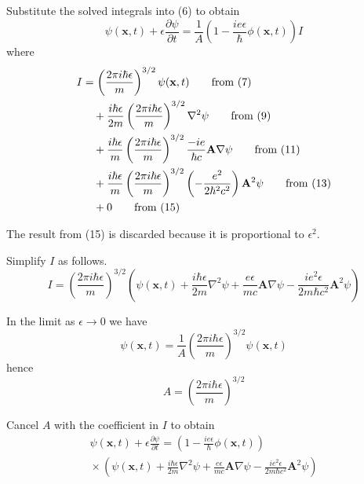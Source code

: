 \documentclass[12pt]{article}
\begin{document}
Substitute the solved integrals into (6) to obtain
\begin{equation*}
\psi(\mathbf x,t)+\epsilon\frac{\partial\psi}{\partial t}
=\frac{1}{A}
\left(1-\frac{ie\epsilon}{\hbar}\phi(\mathbf x,t)\right) I
\end{equation*}
where
\begin{align*}
I&=\left(\frac{2\pi i\hbar\epsilon}{m}\right)^{3/2}\psi(\mathbf x,t)
\tag*{\text{from (7)}}
\\
&\quad{}+\frac{i\hbar\epsilon}{2m}\left(\frac{2\pi i\hbar\epsilon}{m}\right)^{3/2}\nabla^2\psi
\tag*{\text{from (9)}}
\\
&\quad{}+\frac{i\hbar\epsilon}{m}\left(\frac{2\pi i\hbar\epsilon}{m}\right)^{3/2}
\frac{-ie}{\hbar c}\mathbf A\nabla\psi
\tag*{\text{from (11)}}
\\
&\quad{}+\frac{i\hbar\epsilon}{m}
\left(\frac{2\pi i\hbar\epsilon}{m}\right)^{3/2}
\left(-\frac{e^2}{2\hbar^2 c^2}\right)
\mathbf A^2\psi
\tag*{\text{from (13)}}
\\
&\quad{}+0
\tag*{\text{from (15)}}
\end{align*}

The result from (15) is discarded because it is proportional to $\epsilon^2$.

\bigskip
Simplify $I$ as follows.
\begin{equation*}
I=\left(\frac{2\pi i\hbar\epsilon}{m}\right)^{3/2}
\left(
\psi(\mathbf x,t)
+\frac{i\hbar\epsilon}{2m}\nabla^2\psi
+\frac{e\epsilon}{mc}\mathbf A\nabla\psi
-\frac{ie^2\epsilon}{2m\hbar c^2}\mathbf A^2\psi
\right)
\tag{16}
\end{equation*}

\bigskip
In the limit as $\epsilon\rightarrow0$ we have
\begin{equation*}
\psi(\mathbf x,t)=\frac{1}{A}\left(\frac{2\pi i\hbar\epsilon}{m}\right)^{3/2}\psi(\mathbf x,t)
\end{equation*}
hence
\begin{equation*}
A=\left(\frac{2\pi i\hbar\epsilon}{m}\right)^{3/2}
\end{equation*}

Cancel $A$ with the coefficient in $I$ to obtain
\begin{multline*}
\psi(\mathbf x,t)+\epsilon\frac{\partial\psi}{\partial t}
=\left(1-\frac{ie\epsilon}{\hbar}\phi(\mathbf x,t)\right)
\\
{}\times
\left(
\psi(\mathbf x,t)
+\frac{i\hbar\epsilon}{2m}\nabla^2\psi
+\frac{e\epsilon}{mc}\mathbf A\nabla\psi
-\frac{ie^2\epsilon}{2m\hbar c^2}\mathbf A^2\psi
\right)
\end{multline*}
\end{document}
